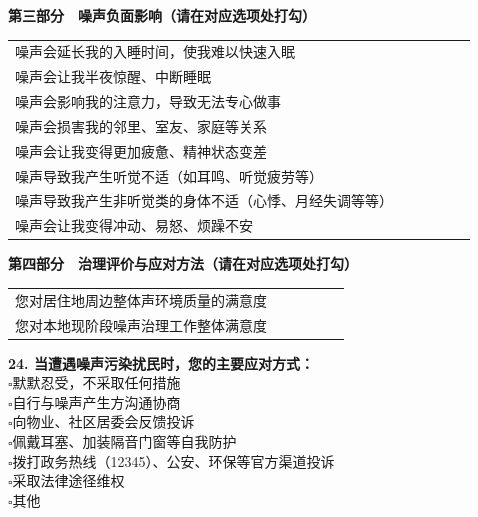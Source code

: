 \begin{appendices}
\begin{center}
\textbf{第三部分　噪声负面影响（请在对应选项处打勾）}
\end{center}

\begin{table}[H]
\centering
{}
\begin{tabular}{|M{5.2cm}|M{1.6cm}|M{1.6cm}|M{1.6cm}|M{1.6cm}|M{1.6cm}|}
\hline
{}
 &  &  &  &  &  \\
\hline
噪声会延长我的入睡时间，使我难以快速入眠 & & & & & \\
\hline
噪声会让我半夜惊醒、中断睡眠 & & & & & \\
\hline
噪声会影响我的注意力，导致无法专心做事 & & & & & \\
\hline
噪声会损害我的邻里、室友、家庭等关系 & & & & & \\
\hline
噪声会让我变得更加疲惫、精神状态变差 & & & & & \\
\hline
噪声导致我产生听觉不适（如耳鸣、听觉疲劳等） & & & & & \\
\hline
噪声导致我产生非听觉类的身体不适（心悸、月经失调等等） & & & & & \\
\hline
噪声会让我变得冲动、易怒、烦躁不安 & & & & & \\
\hline
\end{tabular}
\end{table}

\begin{center}
\textbf{第四部分　治理评价与应对方法（请在对应选项处打勾）}
\end{center}

\begin{table}[H]
\centering
{}
\begin{tabular}{|M{5.2cm}|M{1.6cm}|M{1.6cm}|M{1.6cm}|M{1.6cm}|M{1.6cm}|}
\hline
{}
 &  &  &  &  &  \\
\hline
您对居住地周边整体声环境质量的满意度 & & & & & \\
\hline
您对本地现阶段噪声治理工作整体满意度 & & & & & \\
\hline
\end{tabular}
\end{table}

\textbf{24. 当遭遇噪声污染扰民时，您的主要应对方式：}\\
$\square$默默忍受，不采取任何措施\\
$\square$自行与噪声产生方沟通协商\\
$\square$向物业、社区居委会反馈投诉\\
$\square$佩戴耳塞、加装隔音门窗等自我防护\\
$\square$拨打政务热线（12345）、公安、环保等官方渠道投诉\\
$\square$采取法律途径维权\\
$\square$其他 \underline{\hspace{3cm}}


\end{appendices}
